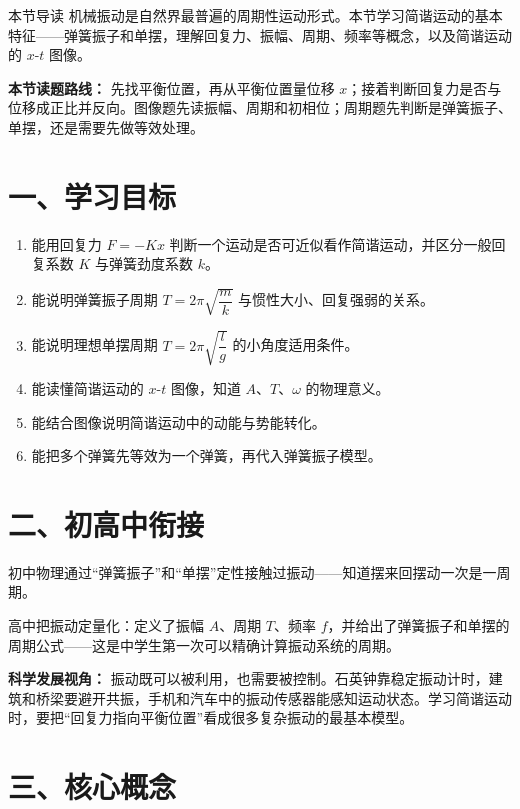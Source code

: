
\begin{learningbox}{本节导读}
机械振动是自然界最普遍的周期性运动形式。本节学习简谐运动的基本特征——弹簧振子和单摆，理解回复力、振幅、周期、频率等概念，以及简谐运动的 $x$-$t$ 图像。
\end{learningbox}

\textbf{本节读题路线：} 先找平衡位置，再从平衡位置量位移 $x$；接着判断回复力是否与位移成正比并反向。图像题先读振幅、周期和初相位；周期题先判断是弹簧振子、单摆，还是需要先做等效处理。

\section*{一、学习目标}

\begin{enumerate}
  \item 能用回复力 $F = -Kx$ 判断一个运动是否可近似看作简谐运动，并区分一般回复系数 $K$ 与弹簧劲度系数 $k$。
  \item 能说明弹簧振子周期 $T = 2\pi\sqrt{\dfrac{m}{k}}$ 与惯性大小、回复强弱的关系。
  \item 能说明理想单摆周期 $T = 2\pi\sqrt{\dfrac{l}{g}}$ 的小角度适用条件。
  \item 能读懂简谐运动的 $x$-$t$ 图像，知道 $A$、$T$、$\omega$ 的物理意义。
  \item 能结合图像说明简谐运动中的动能与势能转化。
  \item 能把多个弹簧先等效为一个弹簧，再代入弹簧振子模型。
\end{enumerate}
\section*{二、初高中衔接}

初中物理通过“弹簧振子”和“单摆”定性接触过振动——知道摆来回摆动一次是一周期。

高中把振动定量化：定义了振幅 $A$、周期 $T$、频率 $f$，并给出了弹簧振子和单摆的周期公式——这是中学生第一次可以精确计算振动系统的周期。

\textbf{科学发展视角：} 振动既可以被利用，也需要被控制。石英钟靠稳定振动计时，建筑和桥梁要避开共振，手机和汽车中的振动传感器能感知运动状态。学习简谐运动时，要把“回复力指向平衡位置”看成很多复杂振动的最基本模型。

\section*{三、核心概念}

